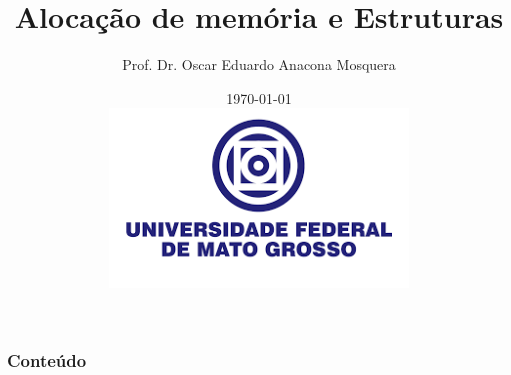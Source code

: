 \documentclass[article]{beamer}%
\title{Alocação de memória e Estruturas}
\author{Prof. Dr. Oscar Eduardo Anacona Mosquera}
\institute{Universidade Federal de Mato Grosso\\ Faculdade de Engenharia\\ Campus Várzea Grande\\Engenharia da Computação
            }
\date{\vfill\scriptsize{\today}\\\vspace{0.4cm}\includegraphics[scale=0.4]{Imagens/Logo.png}}
\begin{document}
\maketitle


\begin{frame}
    \frametitle{Conteúdo}
    \tableofcontents
\end{frame}






%





%



%
%
%
%
%
%
%
%
\end{document}

